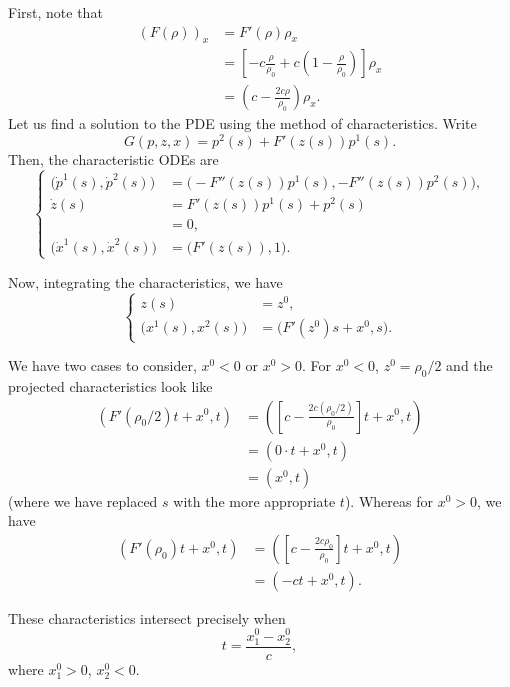 \begin{solution*}
  First, note that
  \begin{align*}
    (F(\rho))_x
    &=F'(\rho)\rho_x\\
    &=\left[-c\frac{\rho}{\rho_0}+c\left(1-\frac{\rho}{\rho_0}\right)\right]\rho_x\\
    &=\left(c-\frac{2c\rho}{\rho_0}\right)\rho_x.
  \end{align*}
  Let us find a solution to the PDE using the method of
  characteristics. Write
  \[
    G(p,z,x)=p^2(s)+F'(z(s))p^1(s).
  \]
  Then, the characteristic ODEs are
  \[
    \left\{
      \begin{aligned}
        \bigl(\dot p^1(s),\dot p^2(s)\bigr)
        &=\bigl(-F''(z(s))p^1(s),-F''(z(s))p^2(s)\bigr),\\
        \dot z(s)
        &=F'(z(s))p^1(s)+p^2(s)\\
        &=0,\\
        \bigl(\dot x^1(s),\dot x^2(s)\bigr)
        &=\bigl(F'(z(s)),1\bigr).
      \end{aligned}
    \right.
  \]

  Now, integrating the characteristics, we have
  \[
    \left\{
      \begin{aligned}
         z(s)
        &=z^0,\\
        \bigl(x^1(s),x^2(s)\bigr)
        &=\bigl(F'(z^0)s+x^0,s\bigr).
      \end{aligned}
    \right.
  \]

  We have two cases to consider, \(x^0<0\) or \(x^0>0\). For \(x^0<0\),
  \(z^0=\rho_0/2\) and the projected characteristics look like
  \begin{align*}
    \left(
      F'(\rho_0/2)t+x^0
    ,t\right)
    &=\left(
      \left[c-\frac{2c(\rho_0/2)}{\rho_0}\right]t+x^0,t
      \right)\\
    &=(0\cdot t+x^0,t)\\
    &=(x^0,t)
  \end{align*}
  (where we have replaced \(s\) with the more appropriate \(t\)). Whereas
  for \(x^0>0\), we have
  \begin{align*}
    \left(
    F'(\rho_0)t+x^0
    ,t\right)
    &=\left(
       \left[c-\frac{2c\rho_0}{\rho_0}\right]t+x^0,t
      \right)\\
    &=(-ct+x^0,t).
  \end{align*}

  These characteristics intersect precisely when
  \[
    t=\frac{x_1^0-x_2^0}{c},
  \]
  where \(x_1^0>0\), \(x_2^0<0\).
\end{solution*}

